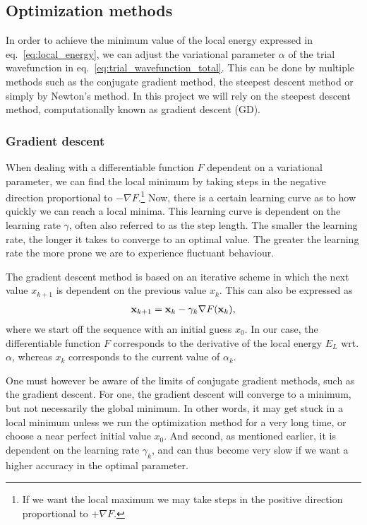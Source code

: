 \documentclass[
    a4paper, aps, twocolumn, floatfix, superscriptaddress,
    nofootinbib]{revtex4-1}
\begin{document}
\subsection{Optimization methods}
In order to achieve the minimum value of the local energy expressed in eq.~\eqref{eq:local_energy}, we can adjust the variational parameter $\alpha$ of the trial wavefunction in eq.~\eqref{eq:trial_wavefunction_total}. This can be done by multiple methods such as the conjugate gradient method, the steepest descent method or simply by Newton's method. In this project we will rely on the steepest descent method, computationally known as gradient descent (GD).
\subsubsection{Gradient descent}
When dealing with a differentiable function $F$ dependent on a variational parameter, we can find the local minimum by taking steps in the negative direction proportional to $-\nabla F$.\footnote{If we want the local maximum we may take steps in the positive direction proportional to $+\nabla F$.} Now, there is a certain learning curve as to how quickly we can reach a local minima. This learning curve is dependent on the learning rate $\gamma$, often also referred to as the step length. The smaller the learning rate, the longer it takes to converge to an optimal value. The greater the learning rate the more prone we are to experience fluctuant behaviour.

The gradient descent method is based on an iterative scheme in which the next value $x_{k+1}$ is dependent on the previous value $x_k$. This can also be expressed as
\begin{align}
    \bold x_{k+1} = \bold x_{k} - \gamma_k\nabla F(\bold x_k),
\end{align}
where we start off the sequence with an initial guess $x_0$. In our case, the differentiable function $F$ corresponds to the derivative of the local energy $E_L$ wrt. $\alpha$, whereas $x_k$ corresponds to the current value of $\alpha_k$.

One must however be aware of the limits of conjugate gradient methods, such as the gradient descent. For one, the gradient descent will converge to a minimum, but not necessarily the global minimum. In other words, it may get stuck in a local minimum unless we run the optimization method for a very long time, or choose a near perfect initial value $x_0$. And second, as mentioned earlier, it is dependent on the learning rate $\gamma_k$, and can thus become very slow if we want a higher accuracy in the optimal parameter.
\end{document}
